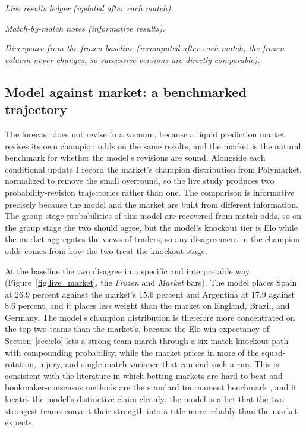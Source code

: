 \documentclass[11pt,letterpaper]{article}
\begin{document}


\medskip
\noindent\textit{Live results ledger (updated after each match).}



\medskip
\noindent\textit{Match-by-match notes (informative results).}



\medskip
\noindent\textit{Divergence from the frozen baseline (recomputed after each match; the
frozen column never changes, so successive versions are directly comparable).}











\subsection{Model against market: a benchmarked trajectory}\label{sec:market}

The forecast does not revise in a vacuum, because a liquid prediction market revises its own champion odds on the same results, and the market is the natural benchmark for whether the model's revisions are sound. Alongside each conditional update I record the market's champion distribution from Polymarket, normalized to remove the small overround, so the live study produces two probability-revision trajectories rather than one. The comparison is informative precisely because the model and the market are built from different information. The group-stage probabilities of this model are recovered from match odds, so on the group stage the two should agree, but the model's knockout tier is Elo while the market aggregates the views of traders, so any disagreement in the champion odds comes from how the two treat the knockout stage.

At the baseline the two disagree in a specific and interpretable way (Figure~\ref{fig:live_market}, the \emph{Frozen} and \emph{Market} bars). The model places Spain at 26.9 percent against the market's 15.6 percent and Argentina at 17.9 against 8.6 percent, and it places less weight than the market on England, Brazil, and Germany. The model's champion distribution is therefore more concentrated on the top two teams than the market's, because the Elo win-expectancy of Section~\ref{sec:elo} lets a strong team march through a six-match knockout path with compounding probability, while the market prices in more of the squad-rotation, injury, and single-match variance that can end such a run. This is consistent with the literature in which betting markets are hard to beat \citep{strumbelj2014, hvattum2010} and bookmaker-consensus methods are the standard tournament benchmark \citep{zeileis2018}, and it locates the model's distinctive claim cleanly: the model is a bet that the two strongest teams convert their strength into a title more reliably than the market expects.
\end{document}
